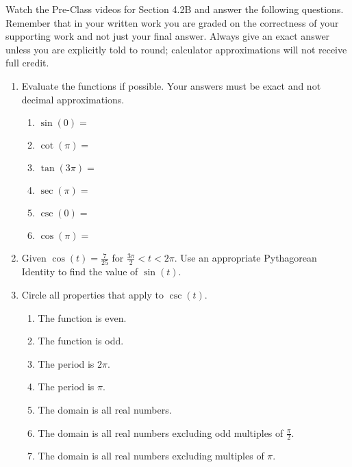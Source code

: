 


\noindent Watch the Pre-Class videos for Section 4.2B and answer the following questions. Remember that in your written work you are graded on the correctness of your supporting work and not just your final answer. Always give an exact answer unless you are explicitly told to round; calculator approximations will not receive full credit. 


\begin{enumerate}
\item  Evaluate the functions if possible.  Your answers must be exact and not decimal approximations.

\begin{enumerate}

\item $\sin(0)=$\vfill
\item $\cot(\pi)=$\vfill
\item $\tan(3\pi)=$\vfill
\item $\sec(\pi)=$\vfill
\item $\csc(0)=$\vfill
\item $\cos(\pi)=$\vfill
\end{enumerate}




\newpage


\item  Given $ \displaystyle \cos(t)=\frac{7}{25}$ for $\displaystyle \frac{3\pi}{2}<t<2\pi$.  Use an appropriate Pythagorean Identity to find the value of $\sin(t)$.\vfill

\item  Circle all properties that apply to $\csc(t)$.
\begin{enumerate}
\item The function is even.
\item The function is odd.
\item The period is $2\pi$.
\item The period is $\pi$.
\item The domain is all real numbers.
\item The domain is all real numbers excluding odd multiples of $\frac{\pi}{2}$.
\item The domain is all real numbers excluding multiples of $\pi$.
\end{enumerate}



\end{enumerate}



